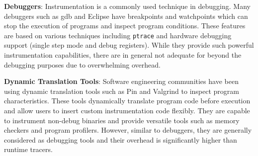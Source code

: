 \noindent \textbf{Debuggers}: \quad
Instrumentation is a commonly used technique in debugging. Many debuggers such as gdb \cite{gdb} and Eclipse have breakpoints and watchpoints which can stop the execution of programs and inspect program conditions. These features are based on various techniques including \texttt{ptrace} and hardware debugging support (single step mode and debug registers). While they provide such powerful instrumentation capabilities, there are in general not adequate for beyond the debugging purposes due to overwhelming overhead.

\noindent \textbf{Dynamic Translation Tools}: \quad
Software engineering communities have been using dynamic translation tools such as Pin \cite{pin} and Valgrind \cite{valgrind} to inspect program characteristics. 
These tools dynamically translate program code before execution and allow users to insert custom instrumentation code flexibly. They are capable to instrument non-debug binaries and provide versatile tools such as memory checkers and program profilers. However, similar to debuggers, they are generally considered as debugging tools and their overhead is significantly higher than runtime tracers.


